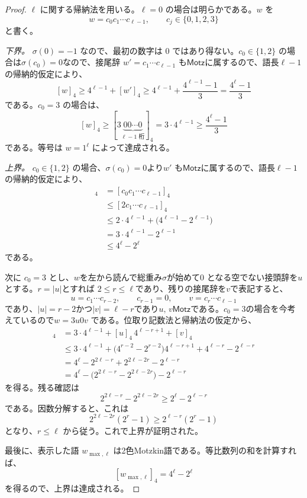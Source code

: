 \documentclass[12pt]{ltjsarticle}
\theoremstyle{plain}
\theoremstyle{definition}
\theoremstyle{plain}
\begin{document}
\begin{proof}
$\ell$ に関する帰納法を用いる。$\ell=0$ の場合は明らかである。$w$ を
\[
 w=c_0c_1\cdots c_{\ell-1},
 \qquad
 c_j\in\{0,1,2,3\}
\]
と書く。

\emph{下界。}
$\sigma(0)=-1$ なので、最初の数字は $0$ ではあり得ない。$c_0\in\{1,2\}$ の場合は$\sigma(c_0)=0$なので、接尾辞 $w'=c_1\cdots c_{\ell-1}$ も$\mathsf{Motz}$に属するので、語長$\ell-1$の帰納的仮定により、
\[
  [w]_4\geq4^{\ell-1}+[w']_4
  \geq4^{\ell-1}+\frac{4^{\ell-1}-1}{3}
  =\frac{4^{\ell}-1}{3}
\]
である。$c_0=3$ の場合は、
\[
  [w]_4
  \geq[3\underbrace{00\cdots0}_{\ell-1\text{ 桁}}]_4
  =3\cdot4^{\ell-1}
  \geq\frac{4^{\ell}-1}{3}
\]
である。等号は $w=1^{\ell}$ によって達成される。

\emph{上界。}
$c_0\in\{1,2\}$ の場合、$\sigma(c_0)=0$より$w'$ も$\mathsf{Motz}$に属するので、語長$\ell-1$の帰納的仮定により、
\begin{align*}
  [w]_4
  &=[c_0c_1\cdots c_{\ell-1}]_4\\
  &\leq[2c_1\cdots c_{\ell-1}]_4\\
  &\leq2\cdot4^{\ell-1}+\bigl(4^{\ell-1}-2^{\ell-1}\bigr)\\
  &=3\cdot4^{\ell-1}-2^{\ell-1}\\
  &\leq4^{\ell}-2^{\ell}
\end{align*}
である。

次に $c_0=3$ とし、$w$を左から読んで総重み$\sigma$が始めて$0$ となる空でない接頭辞を$u$とする。$r=|u|$とすれば $2\leq r\leq\ell$であり、残りの接尾辞を$v$で表記すると、
\[
  u=c_1\cdots c_{r-2},
  \qquad
  c_{r-1}=0,
  \qquad
  v=c_r\cdots c_{\ell-1}
\]
であり、$|u|=r-2$かつ$|v|=\ell-r$であり$u,\, v\mathsf{Motz}$である。$c_0=3$の場合を今考えているので$w=3u0v$ である。位取り記数法と帰納法の仮定から、
\begin{align*}
  [w]_4
  &=3\cdot4^{\ell-1}+[u]_4\,4^{\ell-r+1}+[v]_4\\
  &\leq3\cdot4^{\ell-1}
    +\bigl(4^{r-2}-2^{r-2}\bigr)4^{\ell-r+1}
    +4^{\ell-r}-2^{\ell-r}\\
  &=4^{\ell}-2^{2\ell-r}+2^{2\ell-2r}-2^{\ell-r}\\
  &=4^{\ell}-\bigl(2^{2\ell-r}-2^{2\ell-2r}\bigr)-2^{\ell-r}
\end{align*}
を得る。残る確認は
\[
  2^{2\ell-r}-2^{2\ell-2r}
  \geq2^{\ell}-2^{\ell-r}
\]
である。因数分解すると、これは
\[
  2^{2\ell-2r}(2^r-1)\geq2^{\ell-r}(2^r-1)
\]
となり、$r\leq\ell$ から従う。これで上界が証明された。

最後に、表示した語 $w_{\max,\ell}$ は2色Motzkin語である。等比数列の和を計算すれば、
\[
  [w_{\max,\ell}]_4=4^{\ell}-2^{\ell}
\]
を得るので、上界は達成される。
\end{proof}
\end{document}
